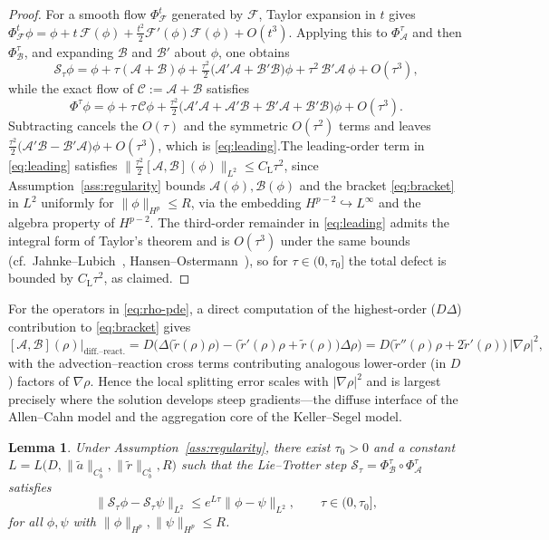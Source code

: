 \documentclass[12pt]{article}
\newtheorem{lemma}[theorem]{Lemma}
\begin{document}
\begin{proof}
For a smooth flow $\Phi^{t}_{\mathcal F}$ generated by $\mathcal F$, Taylor expansion
in $t$ gives
$\Phi^{t}_{\mathcal F}\phi=\phi+t\,\mathcal F(\phi)
+\tfrac{t^{2}}{2}\mathcal F'(\phi)\mathcal F(\phi)+O(t^{3})$.
Applying this to $\Phi^{\tau}_{\mathcal A}$ and then $\Phi^{\tau}_{\mathcal B}$, and
expanding $\mathcal B$ and $\mathcal B'$ about $\phi$, one obtains
\[
\mathcal S_{\tau}\phi=\phi+\tau(\mathcal A+\mathcal B)\phi
+\tfrac{\tau^{2}}{2}\big(\mathcal A'\mathcal A+\mathcal B'\mathcal B\big)\phi
+\tau^{2}\,\mathcal B'\mathcal A\,\phi+O(\tau^{3}),
\]
while the exact flow of $\mathcal C:=\mathcal A+\mathcal B$ satisfies
\[
\Phi^{\tau}\phi=\phi+\tau\,\mathcal C\phi
+\tfrac{\tau^{2}}{2}\big(\mathcal A'\mathcal A+\mathcal A'\mathcal B
+\mathcal B'\mathcal A+\mathcal B'\mathcal B\big)\phi+O(\tau^{3}).
\]
Subtracting cancels the $O(\tau)$ and the symmetric $O(\tau^{2})$ terms and
leaves $\tfrac{\tau^{2}}{2}\big(\mathcal A'\mathcal B-\mathcal B'\mathcal A\big)\phi
+O(\tau^{3})$, which is \eqref{eq:leading}.The leading-order term in \eqref{eq:leading} satisfies
$\big\|\tfrac{\tau^{2}}{2}[\mathcal A,\mathcal B](\phi)\big\|_{L^{2}}
\le C_{\mathrm L}\tau^{2}$, since Assumption~\ref{ass:regularity} bounds
$\mathcal A(\phi),\mathcal B(\phi)$ and the bracket \eqref{eq:bracket} in $L^{2}$
uniformly for $\|\phi\|_{H^{p}}\le R$, via the embedding
$H^{p-2}\hookrightarrow L^{\infty}$ and the algebra property of $H^{p-2}$.
The third-order remainder in \eqref{eq:leading} admits the integral form of
Taylor's theorem and is $O(\tau^{3})$ under the same bounds
(cf.\ Jahnke--Lubich~\cite{jahnke2000error},
Hansen--Ostermann~\cite{hansen2009exponential}), so for $\tau\in(0,\tau_0]$
the total defect is bounded by $C_{\mathrm L}\tau^{2}$, as claimed.
\end{proof}

For the operators in \eqref{eq:rho-pde}, a direct computation of the
highest-order ($D\Delta$) contribution to \eqref{eq:bracket} gives
\[
[\mathcal A,\mathcal B](\rho)\Big|_{\text{diff.--react.}}
=D\Big(\Delta\big(\tilde r(\rho)\rho\big)
-\big(\tilde r'(\rho)\rho+\tilde r(\rho)\big)\Delta\rho\Big)
=D\big(\tilde r''(\rho)\rho+2\tilde r'(\rho)\big)\,|\nabla\rho|^{2},
\]
with the advection--reaction cross terms contributing analogous lower-order
(in $D$) factors of $\nabla\rho$. Hence the local splitting error scales with
$|\nabla\rho|^{2}$ and is largest precisely where the solution develops steep
gradients---the diffuse interface of the Allen--Cahn model and the
aggregation core of the Keller--Segel model.
\begin{lemma}\label{lem:stability}
Under Assumption~\ref{ass:regularity}, there exist $\tau_0>0$ and a constant
$L=L\big(D,\|\tilde a\|_{C^{1}_b},\|\tilde r\|_{C^{1}_b},R\big)$ such that the
Lie--Trotter step $\mathcal S_{\tau}=\Phi^{\tau}_{\mathcal B}\circ\Phi^{\tau}_{\mathcal A}$
satisfies
\[
\|\mathcal S_{\tau}\phi-\mathcal S_{\tau}\psi\|_{L^{2}}\le e^{L\tau}\|\phi-\psi\|_{L^{2}},
\qquad \tau\in(0,\tau_0],
\]
for all $\phi,\psi$ with $\|\phi\|_{H^{p}},\|\psi\|_{H^{p}}\le R$.
\end{lemma}
\end{document}
